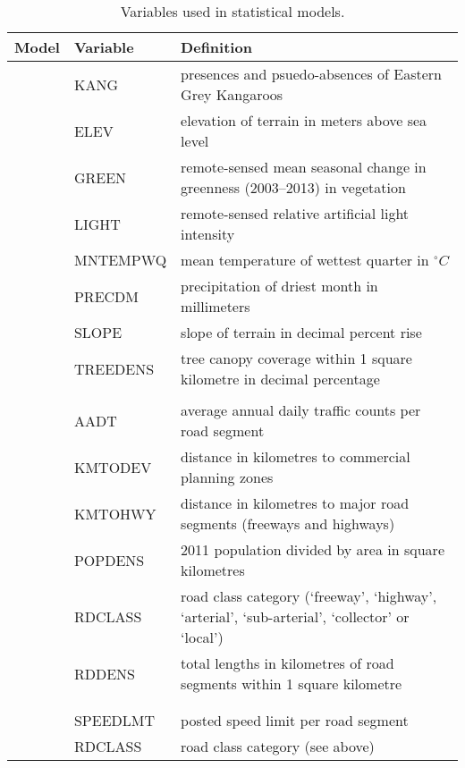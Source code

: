 \begin{table}[!t]
\caption[Variables used in statistical models]{Variables used in statistical models.}
\centering
\begin{tabularx}{0.9\textwidth}{llY} \toprule
Model &Variable    &Definition\\ \midrule 
{}   &KANG        &presences and psuedo-absences of Eastern Grey Kangaroos\\
           		 &ELEV        &elevation of terrain in meters above sea level\\
           		 &GREEN       &remote-sensed mean seasonal change in greenness (2003--2013) in vegetation\\
           		 &LIGHT       &remote-sensed relative artificial light intensity\\
           		 &MNTEMPWQ    &mean temperature of wettest quarter in $^{\circ}C$\\
           		 &PRECDM      &precipitation of driest month in millimeters\\
           		 &SLOPE       &slope of terrain in decimal percent rise\\
           		 &TREEDENS    &tree canopy coverage within 1 square kilometre in decimal percentage\\
&&\\
   &AADT        &average annual daily traffic counts per road segment\\
           		 &KMTODEV     &distance in kilometres to commercial planning zones\\
           		 &KMTOHWY     &distance in kilometres to major road segments (freeways and highways)\\
           		 &POPDENS     &2011 population divided by area in square kilometres\\
           		 &RDCLASS     &road class category (`freeway', `highway', `arterial', `sub-arterial', `collector' or `local')\\
           		 &RDDENS      &total lengths in kilometres of road segments within 1 square kilometre\\
&&\\
 &&\\
    			 &SPEEDLMT    &posted speed limit per road segment	\\
           		 &RDCLASS     &road class category (see above)\\

\end{tabularx}
\end{table}
